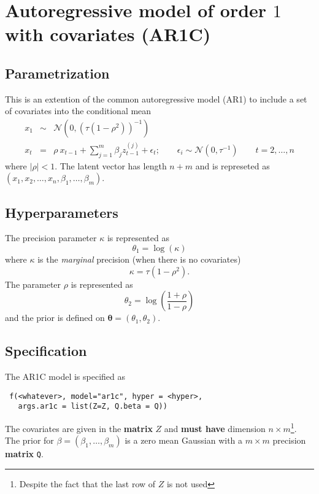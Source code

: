 \documentclass[a4paper,11pt]{article}
\begin{document}
\section*{Autoregressive model of order $1$ with covariates (AR1C)}

\subsection*{Parametrization}

This is an extention of the common autoregressive model (AR1) to
include a set of covariates into the conditional mean
\begin{eqnarray}\nonumber
  x_1&\sim&\mathcal{N}(0,(\tau(1-\rho^2))^{-1}) \\\nonumber
  x_t&=&\rho\ x_{t-1}+ \sum_{j=1}^{m} \beta_j z^{(j)}_{t-1} +
         \epsilon_t; \qquad \epsilon_i\sim\mathcal{N}(0,\tau^{-1}) \qquad  t=2,\dots,n
\end{eqnarray}
where $|\rho|<1$. The latent vector has length $n+m$ and is represeted
as $(x_1, x_2, \ldots, x_n, \beta_1, \ldots, \beta_m)$.


\subsection*{Hyperparameters}

The precision parameter $\kappa$ is represented as
\begin{displaymath}
    \theta_1 =\log(\kappa) 
\end{displaymath}
where $\kappa$ is the \emph{marginal} precision (when there is no covariates)
\begin{displaymath}
    \kappa = \tau (1-\rho^{2}).
\end{displaymath}
The parameter $\rho$ is represented as
\[
\theta_2 = \log\left(\frac{1+\rho}{1-\rho}\right)
\]
and the prior is defined on $\mathbf{\theta}=(\theta_1,\theta_2)$. 

\subsection*{Specification}

The AR1C model is specified as
\begin{verbatim}
 f(<whatever>, model="ar1c", hyper = <hyper>,
   args.ar1c = list(Z=Z, Q.beta = Q))
\end{verbatim}
The covariates are given in the \textbf{matrix} $Z$ and \textbf{must
    have} dimension $n\times m$\footnote{Despite the fact that the
    last row of $Z$ is not used}. The prior for
$\beta = (\beta_1, \ldots, \beta_m)$ is a zero mean Gaussian with a
$m\times m$ precision \textbf{matrix} \texttt{Q}.
\end{document}
